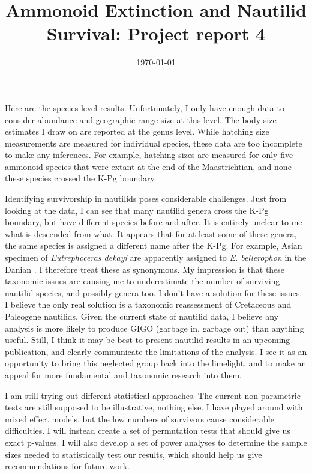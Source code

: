 \documentclass[a4paper]{article}
\title{Ammonoid Extinction and Nautilid Survival: Project report 4}
\date{\today}
\author{}
\begin{document}
\maketitle

\onehalfspacing


Here are the species-level results. Unfortunately, I only have enough data to consider abundance and geographic range size at this level. The body size estimates I draw on \parencite{payneBodySizeSampling2020, payneSelectivityMassExtinctions2023} are reported at the genus level. 
While hatching size measurements are measured for individual species, these data are too incomplete to make any inferences. For example, hatching sizes are measured for only five ammonoid species that were extant at the end of the Maastrichtian, and none these species crossed the K-Pg boundary.


Identifying survivorship in nautilids poses considerable challenges. Just from looking at the data, I can see that many nautilid genera cross the K-Pg boundary, but have different species before and after. It is entirely unclear to me what is descended from what. It appears that for at least some of these genera, the same species is assigned a different name after the K-Pg. For example, Asian specimen of \textit{Eutrephoceras dekayi} are apparently assigned to \textit{E. bellerophon} in the Danian \parencite{malchykLateCretaceousEarly}. I therefore treat these as synonymous. 
My impression is that these taxonomic issues are causing me to underestimate the number of surviving nautilid species, and possibly genera too. 
I don't have a solution for these issues. I believe the only real solution is a taxonomic reassessment of Cretaceous and Paleogene nautilids. 
Given the current state of nautilid data, I believe any analysis is more likely to produce GIGO (garbage in, garbage out) than anything useful. Still, I think it may be best to present nautilid results in an upcoming publication, and clearly communicate the limitations of the analysis. I see it as an opportunity to bring this neglected group back into the limelight, and to make an appeal for more fundamental and taxonomic research into them. 

I am still trying out different statistical approaches. The current non-parametric tests are still supposed to be illustrative, nothing else. I have played around with mixed effect models, but the low numbers of survivors cause considerable difficulties. I will instead create a set of permutation tests that should give us exact p-values. I will also develop a set of power analyses to determine the sample sizes needed to statistically test our results, which should help us give recommendations for future work. 
\end{document}
